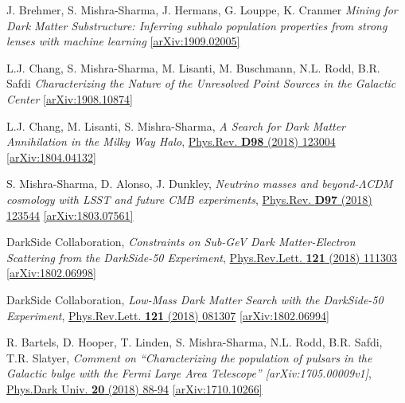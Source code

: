 \documentclass[11pt]{article}
\newenvironment{packed_enumerate}{
\begin{etaremune}
  \setlength{\itemsep}{3pt}
  \setlength{\parskip}{0pt}
  \setlength{\parsep}{0pt}}{\end{etaremune}
}
\begin{document}
\begin{packed_enumerate}

\item J. Brehmer, S. Mishra-Sharma, J. Hermans, G. Louppe, K. Cranmer \emph{Mining for Dark Matter Substructure: Inferring subhalo population properties from strong lenses with machine learning} \href{https://arxiv.org/abs/1909.02005}{[arXiv:1909.02005]}

\item L.J. Chang, S. Mishra-Sharma, M. Lisanti, M. Buschmann, N.L. Rodd, B.R. Safdi \emph{Characterizing the Nature of the Unresolved Point Sources in the Galactic Center} \href{https://arxiv.org/abs/1804.04132}{[arXiv:1908.10874]}

\item L.J. Chang, M. Lisanti, S. Mishra-Sharma, \emph{A Search for Dark Matter Annihilation in the Milky Way Halo}, \href{https://journals.aps.org/prd/abstract/10.1103/PhysRevD.98.123004}{Phys.Rev. \textbf{D98} (2018) 123004} \href{https://arxiv.org/abs/1804.04132}{[arXiv:1804.04132]}

\item S. Mishra-Sharma, D. Alonso, J. Dunkley, \emph{Neutrino masses and beyond-$\Lambda$CDM cosmology with LSST and future CMB experiments}, \href{https://journals.aps.org/prd/abstract/10.1103/PhysRevD.97.123544}{Phys.Rev. \textbf{D97} (2018) 123544}  \href{https://arxiv.org/abs/1803.07561}{[arXiv:1803.07561]}

\item DarkSide Collaboration, \emph{Constraints on Sub-GeV Dark Matter-Electron Scattering from the DarkSide-50 Experiment}, \href{https://journals.aps.org/prl/abstract/10.1103/PhysRevLett.121.111303}{Phys.Rev.Lett. \textbf{121} (2018) 111303} \href{https://arxiv.org/abs/1802.06998}{[arXiv:1802.06998]}

\item DarkSide Collaboration, \emph{Low-Mass Dark Matter Search with the DarkSide-50 Experiment}, \href{https://journals.aps.org/prl/abstract/10.1103/PhysRevLett.121.081307}{Phys.Rev.Lett. \textbf{121} (2018) 081307}  \href{https://arxiv.org/abs/1802.06994}{[arXiv:1802.06994]}

\item R. Bartels, D. Hooper, T. Linden, S. Mishra-Sharma, N.L. Rodd, B.R. Safdi, T.R. Slatyer, \emph{Comment on ``Characterizing the population of pulsars in the Galactic bulge with the
  {\it Fermi} Large Area Telescope'' [arXiv:1705.00009\MakeLowercase{v}1]}, \href{https://www.sciencedirect.com/science/article/pii/S2212686418300268}{Phys.Dark Univ. \textbf{20} (2018) 88-94} \href{https://arxiv.org/abs/1710.10266}{[arXiv:1710.10266]}


\end{packed_enumerate}
\end{document}
